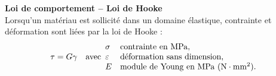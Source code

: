\documentclass[10pt,fleqn]{article} %
\begin{document}
\begin{resultat}
\textbf{Loi de comportement -- Loi de Hooke} ~\\
Lorsqu'un matériau est sollicité dans un domaine élastique, contrainte et déformation sont liées par la loi de Hooke : 
$$ \tau = G \gamma
\quad 
\text{avec}
\begin{array}{ll}
\sigma &\text{contrainte en \text{MPa}},\\
\varepsilon &\text{déformation sans dimension,}\\
E &\text{module de Young en MPa (N}\cdot\text{mm}^2\text{).}
\end{array}
$$
\end{resultat}
\end{document}

